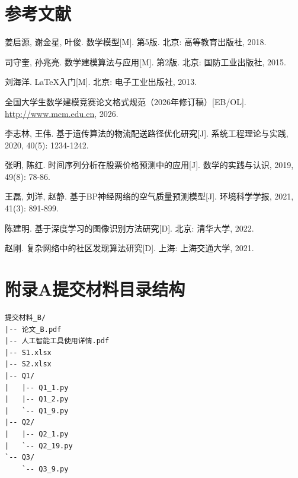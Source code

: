 \documentclass[12pt]{article}
\begin{document}
\section*{参考文献}
\begin{enumerate}[label={[\arabic*]}, nosep]
    \item 姜启源, 谢金星, 叶俊. 数学模型[M]. 第5版. 北京: 高等教育出版社, 2018.
    \item 司守奎, 孙兆亮. 数学建模算法与应用[M]. 第2版. 北京: 国防工业出版社, 2015.
    \item 刘海洋. \LaTeX{}入门[M]. 北京: 电子工业出版社, 2013.
    \item 全国大学生数学建模竞赛论文格式规范（2026年修订稿）[EB/OL]. \url{http://www.mcm.edu.cn}, 2026.
    \item 李志林, 王伟. 基于遗传算法的物流配送路径优化研究[J]. 系统工程理论与实践, 2020, 40(5): 1234-1242.
    \item 张明, 陈红. 时间序列分析在股票价格预测中的应用[J]. 数学的实践与认识, 2019, 49(8): 78-86.
    \item 王磊, 刘洋, 赵静. 基于BP神经网络的空气质量预测模型[J]. 环境科学学报, 2021, 41(3): 891-899.
    \item 陈建明. 基于深度学习的图像识别方法研究[D]. 北京: 清华大学, 2022.
    \item 赵刚. 复杂网络中的社区发现算法研究[D]. 上海: 上海交通大学, 2021.
\end{enumerate}

\section*{附录A\quad 提交材料目录结构}
\begin{treebox}
\begin{verbatim}
提交材料_B/
|-- 论文_B.pdf
|-- 人工智能工具使用详情.pdf
|-- S1.xlsx
|-- S2.xlsx
|-- Q1/
|   |-- Q1_1.py
|   |-- Q1_2.py
|   `-- Q1_9.py
|-- Q2/
|   |-- Q2_1.py
|   `-- Q2_19.py
`-- Q3/
    `-- Q3_9.py
\end{verbatim}
\end{treebox}
\end{document}
